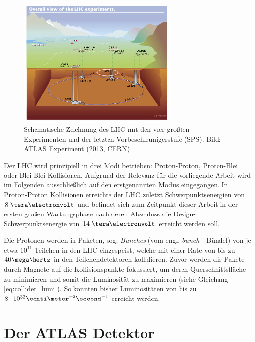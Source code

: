 \begin{figure}[h]
    \centering
    \includegraphics[width=0.7\textwidth]{img/lhc}
    \caption[Zeichnung des LHC mit Vorbeschleunigern und Experimenten]
        {Schematische Zeichnung des LHC mit den vier größten Experimenten und
        der letzten Vorbeschleunigerstufe (SPS). Bild: ATLAS Experiment
        (2013, CERN)}
    \label{fig:LHC}
\end{figure}

Der \ac{LHC} wird prinzipiell in drei Modi betrieben: Proton-Proton,
Proton-Blei oder Blei-Blei Kollisionen. Aufgrund der Relevanz für die
vorliegende Arbeit wird im Folgenden ausschließlich auf den erstgenannten Modus
eingegangen. In Proton-Proton Kollisionen erreichte der \ac{LHC} zuletzt
Schwerpunktsenergien von $8\TeV$ und befindet sich zum Zeitpunkt dieser Arbeit
in der ersten großen Wartungsphase nach deren Abschluss die
Design-Schwerpunktsenergie von $14\TeV$ erreicht werden soll.

Die Protonen werden in Paketen, sog. \textit{Bunches} (vom engl. \textit{bunch}
- Bündel) von je etwa $10^{11}$ Teilchen in den \ac{LHC} eingespeist, welche
mit einer Rate von bis zu $40\mega\hertz$ in den Teilchendetektoren
kollidieren. Zuvor werden die Pakete durch Magnete auf die Kollisionspunkte
fokussiert, um deren Querschnittsfläche zu minimieren und somit die Luminosität
zu maximieren (siehe Gleichung \ref{eq:collider_lumi}). So konnten bisher
Luminositäten von bis zu $8\cdot 10^{33} \centi\meter^{-2}\second^{-1}$
erreicht werden.



%
\section{Der ATLAS Detektor}
\label{atlas_detector}

